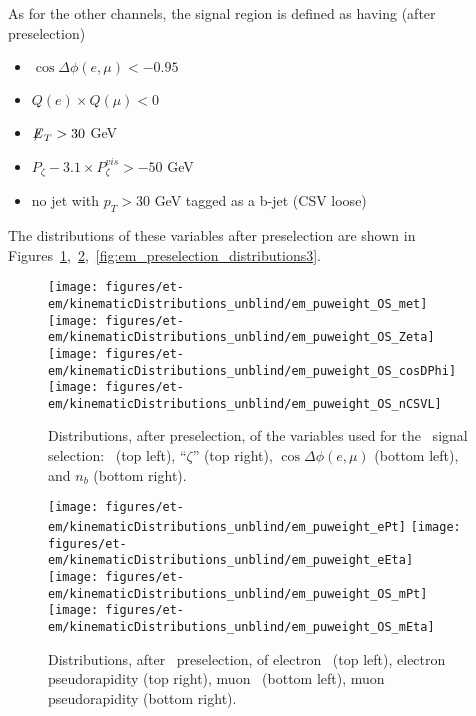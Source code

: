 As for the other channels, the signal region is defined as having (after preselection)
\begin{itemize}
  \item $\cos{\Delta \phi (e,\mu)}<-0.95$
  \item $Q(e) \times Q(\mu) < 0$
  \item ${\not\mathrel{E}}_T>30$ GeV
  \item $P_{\zeta}- 3.1 \times P_{\zeta}^{vis} > -50$ GeV
  \item no jet with $p_T>30$ GeV tagged as a b-jet (CSV loose)
\end{itemize}

The distributions of these variables after preselection are shown in
Figures~\ref{fig:em_preselection_distributions1},~\ref{fig:em_preselection_distributions2},~\ref{fig:em_preselection_distributions3}.

\begin{figure}[thbp!]\centering
  \texttt{[image: figures/et-em/kinematicDistributions\_unblind/em\_puweight\_OS\_met]}
  \texttt{[image: figures/et-em/kinematicDistributions\_unblind/em\_puweight\_OS\_Zeta]} \\
  \texttt{[image: figures/et-em/kinematicDistributions\_unblind/em\_puweight\_OS\_cosDPhi]}
  \texttt{[image: figures/et-em/kinematicDistributions\_unblind/em\_puweight\_OS\_nCSVL]}
  \caption{\label{fig:em_preselection_distributions1} Distributions,
    after preselection, of the variables used for the \tetm ~signal
    selection: \ETslash ~(top left), ``$\zeta$'' (top right),
    $\cos{\Delta \phi (e,\mu)}$ (bottom left), and $n_b$ (bottom
    right).}
\end{figure}

\begin{figure}[thbp!]\centering
  \texttt{[image: figures/et-em/kinematicDistributions\_unblind/em\_puweight\_ePt]}
  \texttt{[image: figures/et-em/kinematicDistributions\_unblind/em\_puweight\_eEta]} \\
  \texttt{[image: figures/et-em/kinematicDistributions\_unblind/em\_puweight\_OS\_mPt]}
  \texttt{[image: figures/et-em/kinematicDistributions\_unblind/em\_puweight\_OS\_mEta]}
  \caption{\label{fig:em_preselection_distributions2} Distributions,
    after \tetm ~preselection, of electron \pt ~(top left), electron
    pseudorapidity (top right), muon \pt ~(bottom left), muon
    pseudorapidity (bottom right).}
\end{figure}

